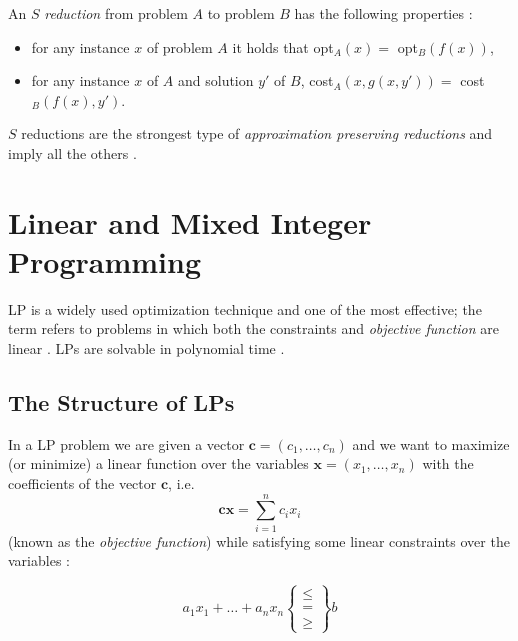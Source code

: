 An $S$ \emph{reduction} from problem $A$ to problem $B$ has the following properties \cite{Crescenzi1997ASG}:
\begin{itemize}
	\item for any instance $x$ of problem $A$ it holds that opt$_{A} (x) = $
	      opt$_{B} (f(x))$,
	\item for any instance $x$ of $A$ and solution $y'$ of $B$, cost$_{A} (x,
		      g(x, y')) = $ cost$_{B} (f(x), y')$.
\end{itemize}

$S$ reductions are the strongest type of \emph{approximation preserving
	reductions} and imply all the others \cite{Crescenzi1997ASG}.

\section{Linear and Mixed Integer Programming}%
\label{sec:linear_and_mixed_integer_programming}

\acrfull{LP} is a widely used optimization technique and one of the most
effective; the term refers to problems in which both the constraints and \emph{objective
	function} are linear
\cite{Edgar2001,Vanderbei2008,Dantzig1998,Martin1998}. \acrshort{LP}s are solvable in polynomial time \cite{KHACHIYAN198053,Karmarkar1984}.

\subsection{The Structure of \acrshort{LP}s}%
\label{sub:the_structure_of_a_linear_programming_model}

In a \acrshort{LP} problem we are given a vector $ \mathbf{c} = (c_1,
	\dots, c_n) $ and we want to maximize (or minimize) a linear function over
the variables $ \mathbf{x} = (x_1, \dots, x_n) $ with the coefficients of the
vector $ \mathbf{c} $, i.e.
\begin{equation*}
	\mathbf{cx} = \sum^{n}_{i=1} c_i x_i
\end{equation*}
(known as the \emph{objective function}) while satisfying some linear
constraints over the variables \cite{Bertsimas1997,Vanderbei2008}:

\begin{equation*}
	a_1 x_1 + \dots + a_n x_n \begin{Bmatrix} \leq \\ = \\ \geq \end{Bmatrix} b
\end{equation*}

